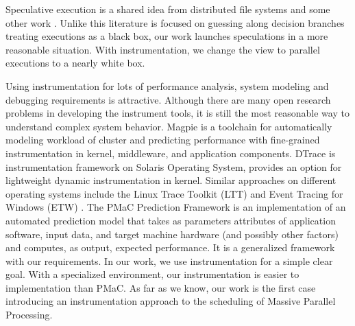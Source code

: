 Speculative execution is a shared idea from distributed file systems \cite{Nightingale:2006:SED:1189256.1189258} and some other work \cite{Su:2007:AIC:1294261.1294284} . Unlike this literature is focused on guessing along decision branches treating executions as a black box, our work launches speculations in a more reasonable situation. With instrumentation, we change the view to parallel executions to a nearly white box.

Using instrumentation for lots of performance analysis, system modeling and debugging requirements is attractive. Although there are many open research problems in developing the instrument tools, it is still the most reasonable way to understand complex system behavior. Magpie \cite{Barham:2004:UMR:1251254.1251272} is a toolchain for automatically modeling workload of cluster and predicting performance with fine-grained instrumentation in kernel, middleware, and application components. DTrace \cite{Cantrill:2004:DIP:1247415.1247417} is instrumentation framework on Solaris Operating System, provides an option for lightweight dynamic instrumentation in kernel. Similar approaches on different operating systems include the Linux Trace Toolkit (LTT) \cite{Yaghmour:2000:MCS:1267724.1267726} and Event Tracing for Windows (ETW) \cite{etw}. The PMaC Prediction Framework \cite{Carrington:2006:PPF:1134241.1708446} is an implementation of an automated prediction model that takes as parameters attributes of application software, input data, and target machine hardware (and possibly other factors) and computes, as output, expected performance. It is a generalized framework with our requirements. In our work, we use instrumentation for a simple clear goal. With a specialized environment, our instrumentation is easier to implementation than PMaC. As far as we know, our work is the first case introducing an instrumentation approach to the scheduling of Massive Parallel Processing.

